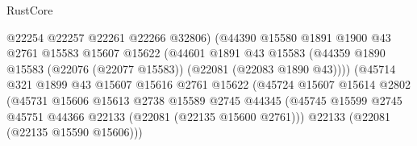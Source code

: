 \begin{lexlean}{RustCore}
\begin{coremodule}
                                        @22254
                                        @22257
                                        @22261
                                        @22266
                                        @32806)
                                      (@44390
                                        @15580
                                        @1891
                                        @1900
                                        @43
                                        @2761
                                        @15583
                                        @15607
                                        @15622
                                        (@44601
                                          @1891
                                          @43
                                          @15583
                                          (@44359
                                            @1890
                                            @15583
                                            (@22076 (@22077 @15583))
                                            (@22081 (@22083 @1890 @43))))
                                        (@45714
                                          @321
                                          @1899
                                          @43
                                          @15607
                                          @15616
                                          @2761
                                          @15622
                                          (@45724
                                            @15607
                                            @15614
                                            @2802
                                            (@45731
                                              @15606
                                              @15613
                                              @2738
                                              @15589
                                              @2745
                                              @44345
                                              (@45745
                                                @15599
                                                @2745
                                                @45751
                                                @44366
                                                @22133
                                                (@22081 (@22135 @15600 @2761)))
                                              @22133
                                              (@22081 (@22135 @15590 @15606)))

\end{coremodule}
\end{lexlean}

